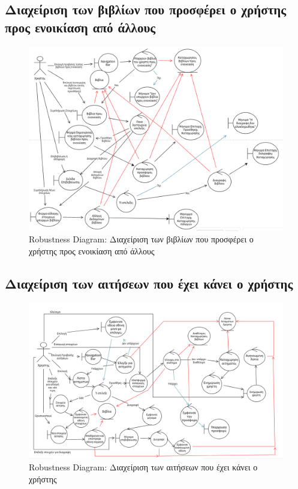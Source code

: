 \documentclass[12pt,a4paper]{article}
\begin{document}
\subsection{Διαχείριση των βιβλίων που προσφέρει ο χρήστης προς ενοικίαση από άλλους}
\begin{figure}[H]
	\includegraphics[width=\textwidth]{Manage User Book Listings Robustness.png}
	\caption{Robustness Diagram: Διαχείριση των βιβλίων που προσφέρει ο χρήστης προς ενοικίαση από άλλους}
	\label{Robustness Diagram: Διαχείριση των βιβλίων που προσφέρει ο χρήστης προς ενοικίαση από άλλους}
\end{figure}

\subsection{Διαχείριση των αιτήσεων που έχει κάνει ο χρήστης}
\begin{figure}[H]
	\includegraphics[width=\textwidth]{Manage User Requests Robustness.png}
	\caption{Robustness Diagram: Διαχείριση των αιτήσεων που έχει κάνει ο χρήστης}
	\label{Robustness Diagram: Διαχείριση των αιτήσεων που έχει κάνει ο χρήστης}
\end{figure}
\end{document}
